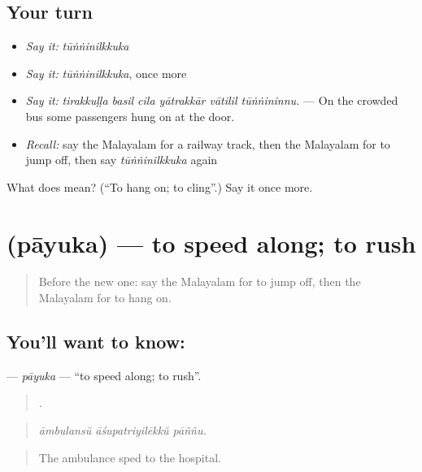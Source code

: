 \subsection*{Your turn}
\begin{itemize}
\raggedright
  \item \emph{Say it:} \emph{tūṅṅinilkkuka}
  \item \emph{Say it:} \emph{tūṅṅinilkkuka}, once more
  \item \emph{Say it:} \emph{tirakkuḷḷa basil cila yātrakkār vātilil tūṅṅininnu.} — On the crowded bus some passengers hung on at the door.
  \item \emph{Recall:} say the Malayalam for a railway track, then the Malayalam for to jump off, then say \emph{tūṅṅinilkkuka} again
\end{itemize}

\begin{tcolorbox}[breakable,colback=teal!4,colframe=teal!35!black,title={Before you move on}]
What does  mean? (\textquotedblleft{}To hang on; to cling\textquotedblright{}.) Say it once more.
\end{tcolorbox}
\section[\texorpdfstring{\ml{പായുക} (pāyuka)}{പായുക (pāyuka)}]{ (pāyuka) — to speed along; to rush}

\label{lesson:ML-C474-payuka}



\begin{quote}
Before the new one: say the Malayalam for to jump off, then the Malayalam for to hang on.
\end{quote}

\subsection*{You'll want to know: }
\textbf{} — \emph{pāyuka} — \textquotedblleft{}to speed along; to rush\textquotedblright{}.

\begin{quote}
  .
\end{quote}

\begin{quote}
\emph{āmbulansŭ āśupatriyilēkkŭ pāññu.}
\end{quote}

\begin{quote}
The ambulance sped to the hospital.
\end{quote}

